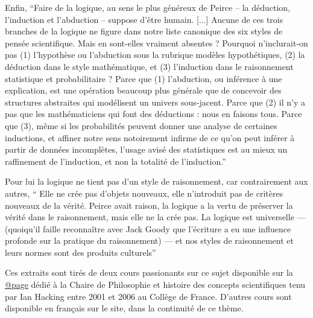 {Enfin, \enquote{Faire de la logique, au sens le plus généreux de Peirce – la déduction, l’induction et l’abduction – suppose d’être humain. [...] Aucune de ces trois branches de la logique ne figure dans notre liste canonique des six styles de pensée scientifique. Mais en sont-elles vraiment absentes ? Pourquoi n’inclurait-on pas (1) l’hypothèse ou l’abduction sous la rubrique modèles hypothétiques, (2) la déduction dans le style mathématique, et (3) l’induction
dans le raisonnement statistique et probabilitaire ? Parce que (1) l’abduction, ou inférence à une explication, est une opération beaucoup plus générale que de concevoir des structures abstraites qui modélisent un univers sous-jacent. Parce que (2) il n’y a pas que les mathématiciens qui font des déductions : nous en faisons tous. Parce que (3), même si les probabilités peuvent donner une analyse de certaines inductions, et affiner notre sens notoirement infirme de ce qu’on peut inférer à partir de données incomplètes, l’usage avisé des statistiques est au mieux un raffinement de l’induction, et non la totalité de l’induction.}

Pour lui la logique ne tient pas d'un style de raisonnement, car contrairement aux autres, \enquote{ Elle  ne  crée  pas  d’objets  nouveaux, elle  n’introduit pas de critères nouveaux de la vérité. Peirce avait raison, la  logique a la vertu de préserver la vérité dans le raisonnement, mais elle ne la crée pas. La logique est universelle — (quoiqu’il faille reconnaître avec  Jack Goody que l’écriture a eu une influence profonde sur la pratique du raisonnement) — et nos styles de raisonnement et leurs normes sont des produits culturels}

Ces extraits sont tirés de deux cours passionants sur ce sujet \autocites{Hacking2002, Hacking2006} disponible sur la \href{http://www.college-de-france.fr/site/ian-hacking/index.htm}{@page} dédié à la Chaire de Philosophie et histoire des concepts scientifiques tenu par Ian Hacking entre 2001 et 2006 au Collège de France. D'autres cours sont disponible en français sur le site, dans la continuité de ce thème.}




